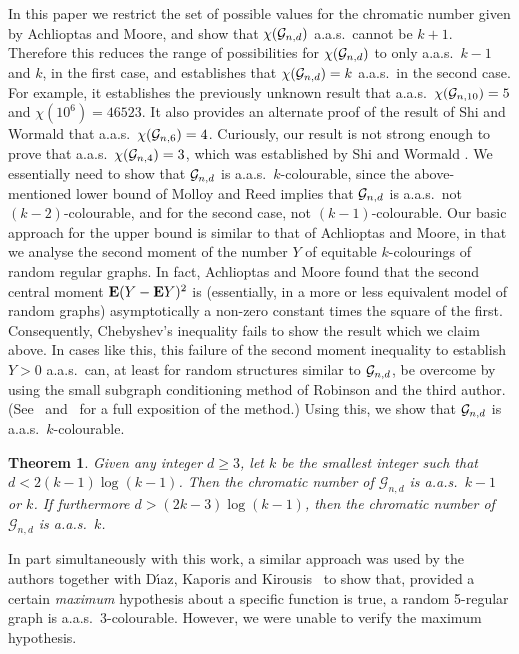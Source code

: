 \documentclass[12pt]{article}
\newtheorem{thm}{Theorem}
\def\G{{\cal G}}
\def\ex{{\bf E}}
\def\Gnd{\G_{n,d}}
\def\Gnfour{\G_{n,4}}
\def\Gnsix{\G_{n,6}}
\def\Gnten{\G_{n,10}}
\newcommand{\cG} {\ensuremath{\mathcal G}}
\begin{document}
In this paper we restrict the set of possible values for the chromatic number given by Achlioptas and Moore, and show that $\chi(\Gnd)$ a.a.s.\ cannot be $k+1$. Therefore this reduces the range of possibilities for $\chi(\Gnd)$ to only a.a.s.\ 
$k-1$ and $k$, in the first case, and establishes that $\chi(\Gnd)=k$ a.a.s.\
in the second case.
For example,
it establishes
the previously unknown result that a.a.s.\ $\chi(\Gnten)=5$ and $\chi(10^6)=46523$.
It also provides
an alternate proof of the result of Shi and Wormald \cite{SW} 
that a.a.s.\  $\chi(\Gnsix)=4$. Curiously, our result is not strong enough to
prove that a.a.s.\ $\chi(\Gnfour)=3$, which was established by
Shi and Wormald \cite{SW4}. 
%
We essentially need to show that $\Gnd$ is a.a.s.\ $k$-colourable, since the above-mentioned lower bound of Molloy and Reed implies that $\Gnd$ is a.a.s.\ not $(k-2)$-colourable, and for the second case, not $(k-1)$-colourable. Our  basic approach for the upper bound is similar to that of Achlioptas and Moore, in that we analyse the second moment of the number $Y$ of equitable $k$-colourings of random regular graphs. 
% 
%
In fact, Achlioptas and Moore found that the second central moment $\ex (Y-\ex Y)^2$ is (essentially, in a more or less equivalent model of random graphs) asymptotically a non-zero constant times the square of the first. Consequently, Chebyshev's inequality fails to show the result which we claim above. In cases like this, this failure of the second moment inequality
to establish $Y>0$ a.a.s.\
can, at least for random structures similar to $\Gnd$, be overcome by using 
the small subgraph conditioning method
of Robinson and the third author. (See~ \cite[Chapter 9]{JLR} 
and~\cite{NW99} for a full exposition of the method.)
Using this, we show  that $\Gnd$ is a.a.s.\ $k$-colourable.
%
\begin{thm}\label{thm:main}
Given any integer $d\ge3$, let $k$ be the smallest integer such that $d<2(k-1)\log(k-1)$. Then the chromatic number of $\cG_{n,d}$ is a.a.s.\ $k-1$ or $k$. If furthermore $d>(2k-3)\log(k-1)$, then the chromatic number of $\cG_{n,d}$ is a.a.s.\ $k$.
\end{thm}
%
In part simultaneously with this work, a similar approach was used by the authors together with D{\' \i}az, Kaporis and Kirousis~\cite{Diaz} to show that, provided a certain {\em maximum} hypothesis about a specific function is true, a random 5-regular graph is a.a.s.\ 3-colourable. However, we were unable to verify the maximum hypothesis. 
\end{document}

